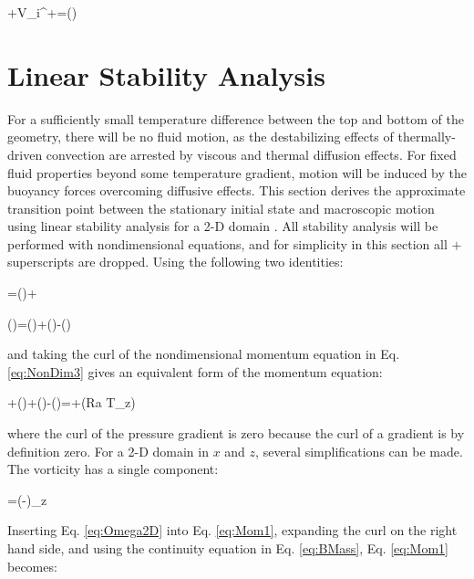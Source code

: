 \documentclass[10pt]{article}
\numberwithin{equation}{section} %
\begin{document}
\beq
\label{eq:EnergyNonDim}
+V_i^+=\left(\right)
\eeq

\clearpage
\section{Linear Stability Analysis}
\label{sec:Stability}

For a sufficiently small temperature difference between the top and bottom of the geometry, there will be no fluid motion, as the destabilizing effects of thermally-driven convection are arrested by viscous and thermal diffusion effects. For fixed fluid properties beyond some temperature gradient, motion will be induced by the buoyancy forces overcoming diffusive effects. This section derives the approximate transition point between the stationary initial state and macroscopic motion using linear stability analysis for a 2-D domain \cite{sandberg}. All stability analysis will be performed with nondimensional equations, and for simplicity in this section all \(+\) superscripts are dropped. Using the following two identities:

\beq
{}\cdot\nabla{}=\nabla\left(\right)+\vv{\omega}\times{}
\eeq

\beq
\nabla\times\left(\vv{\omega}\times{}\right)=\vv{\omega}(\nabla\cdot{})+(\cdot\nabla)\vv{\omega}-(\vv{\omega}\cdot\nabla)
\eeq

and taking the curl of the nondimensional momentum equation in Eq. \eqref{eq:NonDim3} gives an equivalent form of the momentum equation:

\beq
\label{eq:Mom1}
\left\lbrack{}+\vv{\omega}(\nabla\cdot{})+(\cdot\nabla)\vv{\omega}-(\vv{\omega}\cdot\nabla)\right\rbrack=\nabla\cdot\nabla\vv{\omega}+\nabla\times\left(Ra T_z\right)
\eeq

where the curl of the pressure gradient is zero because the curl of a gradient is by definition zero. For a 2-D domain in \(x\) and \(z\), several simplifications can be made. The vorticity has a single component:

\beq
\label{eq:Omega2D}
\vv{\omega}=\left(-\right)_z
\eeq

Inserting Eq. \eqref{eq:Omega2D} into Eq. \eqref{eq:Mom1}, expanding the curl on the right hand side, and using the continuity equation in Eq. \eqref{eq:BMass}, Eq. \eqref{eq:Mom1} becomes:
\end{document}
